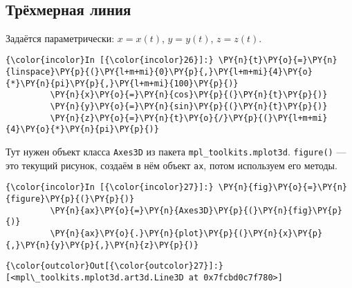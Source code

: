    \begin{center}
    \end{center}
    { \hspace*{\fill} \\}
    
\subsection{Трёхмерная линия}
\label{matplotlib8}

Задаётся параметрически: \(x=x(t)\), \(y=y(t)\), \(z=z(t)\).

    \begin{Verbatim}[commandchars=\\\{\}]
{\color{incolor}In [{\color{incolor}26}]:} \PY{n}{t}\PY{o}{=}\PY{n}{linspace}\PY{p}{(}\PY{l+m+mi}{0}\PY{p}{,}\PY{l+m+mi}{4}\PY{o}{*}\PY{n}{pi}\PY{p}{,}\PY{l+m+mi}{100}\PY{p}{)}
         \PY{n}{x}\PY{o}{=}\PY{n}{cos}\PY{p}{(}\PY{n}{t}\PY{p}{)}
         \PY{n}{y}\PY{o}{=}\PY{n}{sin}\PY{p}{(}\PY{n}{t}\PY{p}{)}
         \PY{n}{z}\PY{o}{=}\PY{n}{t}\PY{o}{/}\PY{p}{(}\PY{l+m+mi}{4}\PY{o}{*}\PY{n}{pi}\PY{p}{)}
\end{Verbatim}

    Тут нужен объект класса \texttt{Axes3D} из пакета
\texttt{mpl\_toolkits.mplot3d}. \texttt{figure()} --- это текущий рисунок,
создаём в нём объект \texttt{ax}, потом используем его методы.

    \begin{Verbatim}[commandchars=\\\{\}]
{\color{incolor}In [{\color{incolor}27}]:} \PY{n}{fig}\PY{o}{=}\PY{n}{figure}\PY{p}{(}\PY{p}{)}
         \PY{n}{ax}\PY{o}{=}\PY{n}{Axes3D}\PY{p}{(}\PY{n}{fig}\PY{p}{)}
         \PY{n}{ax}\PY{o}{.}\PY{n}{plot}\PY{p}{(}\PY{n}{x}\PY{p}{,}\PY{n}{y}\PY{p}{,}\PY{n}{z}\PY{p}{)}
\end{Verbatim}

            \begin{Verbatim}[commandchars=\\\{\}]
{\color{outcolor}Out[{\color{outcolor}27}]:} [<mpl\_toolkits.mplot3d.art3d.Line3D at 0x7fcbd0c7f780>]
\end{Verbatim}
        
    \begin{center}
    \end{center}
    { \hspace*{\fill} \\}
    

